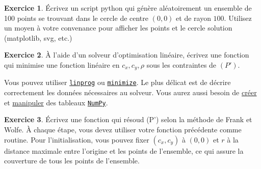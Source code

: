 \documentclass[a4paper,francais]{article}
\theoremstyle{definition}
\newtheorem{exercice}{Exercice}[section]
\begin{document}
\begin{exercice}
  \'Ecrivez un script python qui génère aléatoirement un ensemble de 100 points se trouvant
  dans le cercle de centre $(0,0)$ et de rayon $100$. Utilisez un moyen à votre convenance
  pour afficher les points et le cercle solution (matplotlib, svg, etc.)   
\end{exercice}

\begin{exercice}
  \`A l'aide d'un solveur d'optimisation linéaire, écrivez une fonction
  qui minimise une fonction linéaire en $c_x, c_y, \rho$ sous les contraintes de $(P')$.

  Vous pouvez utiliser
  \href{https://docs.scipy.org/doc/scipy-1.3.3/reference/generated/scipy.optimize.linprog.html#scipy.optimize.linprog}{\texttt{linprog}} ou
  \href{https://docs.scipy.org/doc/scipy-1.3.3/reference/generated/scipy.optimize.minimize.html}{\texttt{minimize}}.
  Le plus délicat est de décrire correctement les données nécessaires au solveur.
  Vous aurez aussi besoin de
  \href{https://docs.scipy.org/doc/numpy/reference/routines.array-creation.html}{créer} et
  \href{https://docs.scipy.org/doc/numpy/reference/routines.array-manipulation.html}{manipuler} des
  tableaux
  \href{https://numpy.org/doc/stable/contents.html#numpy-docs-mainpage}{\texttt{NumPy}}. 
\end{exercice}

\begin{exercice}
  \'Ecrivez une fonction qui résoud (P') selon la méthode de Frank et Wolfe.
  \`A chaque étape, vous devez utiliser votre fonction précédente comme routine. 
  Pour l'initialisation, vous pouvez fixer $(c_x, c_y)$ à $(0,0)$ et $r$ à la
  distance maximale entre l'origine et les points de l'ensemble, ce qui assure
  la couverture de tous les points de l'ensemble.
\end{exercice}
\end{document}
